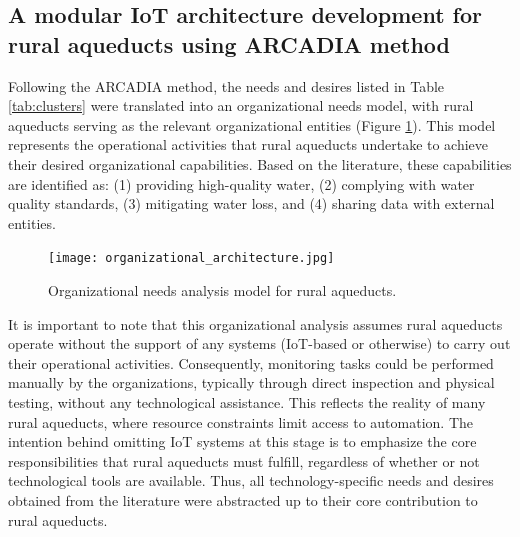 \documentclass[conference]{IEEEtran}
\begin{document}

\subsection{A modular IoT architecture development for rural aqueducts using ARCADIA method}
Following the ARCADIA method, the needs and desires listed in Table \ref{tab:clusters} were translated into an organizational needs model, with rural aqueducts serving as the relevant organizational entities (Figure \ref{fig:oab}). This model represents the operational activities that rural aqueducts undertake to achieve their desired organizational capabilities. Based on the literature, these capabilities are identified as: (1) providing high-quality water, (2) complying with water quality standards, (3) mitigating water loss, and (4) sharing data with external entities.

\begin{figure}[hbt]
\centering
\texttt{[image: organizational\_architecture.jpg]}
\caption{Organizational needs analysis model for rural aqueducts.}
\label{fig:oab}
\end{figure}

It is important to note that this organizational analysis assumes rural aqueducts operate without the support of any systems (IoT-based or otherwise) to carry out their operational activities. Consequently, monitoring tasks could be performed manually by the organizations, typically through direct inspection and physical testing, without any technological assistance. This reflects the reality of many rural aqueducts, where resource constraints limit access to automation. The intention behind omitting IoT systems at this stage is to emphasize the core responsibilities that rural aqueducts must fulfill, regardless of whether or not technological tools are available.
Thus, all technology-specific needs and desires obtained from the literature were abstracted
up to their core contribution to rural aqueducts.
\end{document}
